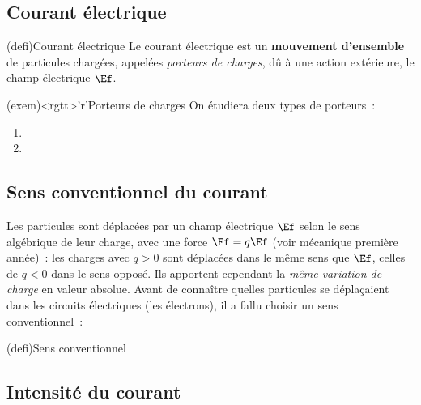 \documentclass[../../main/main.tex]{subfiles}
\begin{document}
\subsection{Courant électrique}
\begin{tcbraster}[raster columns=2, raster equal height=rows]
	\begin{tcb*}[label=def:courant](defi){Courant électrique}
		Le courant électrique est un \textbf{mouvement d'ensemble} de particules
		chargées, appelées \textit{porteurs de charges}, dû à une action
		extérieure, le champ électrique $\Ef$.
	\end{tcb*}
	\begin{tcb}[label=exem:porteurs](exem)<rgtt>'r'{Porteurs de charges}
		On étudiera deux types de porteurs~:
		\begin{enumerate}
			\item {}%
			\item {}%
		\end{enumerate}
	\end{tcb}
\end{tcbraster}

\subsection{Sens conventionnel du courant}

Les particules sont déplacées par un champ électrique $\Ef$ selon le sens
algébrique de leur charge, avec une force $\Ff = q\Ef$ (voir mécanique
première année)~: les charges avec $q>0$ sont déplacées dans le même sens
que $\Ef$, celles de $q<0$ dans le sens opposé. Ils apportent cependant la
\textit{même variation de charge} en valeur absolue. Avant de connaître
quelles particules se déplaçaient dans les circuits électriques (les
électrons), il a fallu choisir un sens conventionnel~:
\begin{tcb*}[label=def:sensconv](defi){Sens conventionnel}
\end{tcb*}

\subsection{Intensité du courant}
\end{document}
